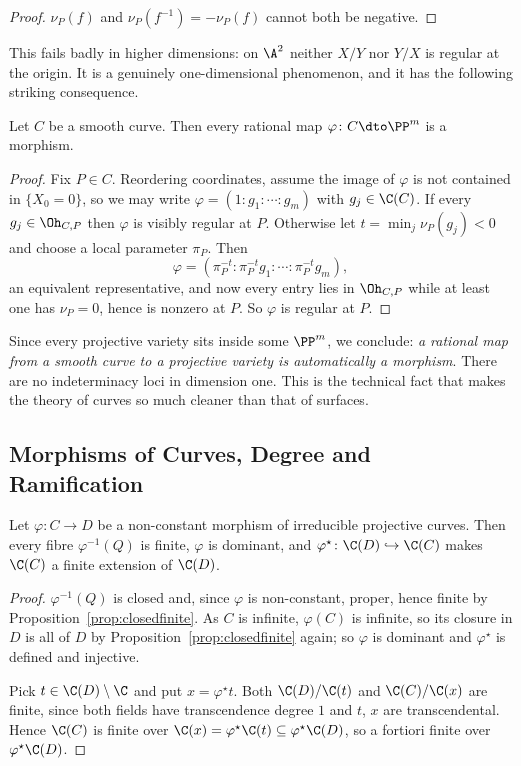 \begin{proof}
	$\nu_P(f)$ and $\nu_P(f^{-1}) = -\nu_P(f)$ cannot both be negative.
\end{proof}

This fails badly in higher dimensions: on $\A^2$ neither $X/Y$ nor $Y/X$ is regular at the origin. It is a genuinely one-dimensional phenomenon, and it has the following striking consequence.

\begin{corollary}\label{cor:ratismorph}
	Let $C$ be a smooth curve. Then every rational map $\varphi \colon C \dto \PP^m$ is a morphism.
\end{corollary}

\begin{proof}
	Fix $P \in C$. Reordering coordinates, assume the image of $\varphi$ is not contained in $\{X_0 = 0\}$, so we may write $\varphi = (1 : g_1 : \cdots : g_m)$ with $g_j \in \C(C)$. If every $g_j \in \Oh_{C,P}$ then $\varphi$ is visibly regular at $P$. Otherwise let $t = \min_j \nu_P(g_j) < 0$ and choose a local parameter $\pi_P$. Then
	$$\varphi = \left(\pi_P^{-t} : \pi_P^{-t}g_1 : \cdots : \pi_P^{-t}g_m\right),$$
	an equivalent representative, and now every entry lies in $\Oh_{C,P}$ while at least one has $\nu_P = 0$, hence is nonzero at $P$. So $\varphi$ is regular at $P$.
\end{proof}

Since every projective variety sits inside some $\PP^m$, we conclude: \emph{a rational map from a smooth curve to a projective variety is automatically a morphism}. There are no indeterminacy loci in dimension one. This is the technical fact that makes the theory of curves so much cleaner than that of surfaces.

\subsection{Morphisms of Curves, Degree and Ramification}

\begin{proposition}\label{prop:degfinite}
	Let $\varphi \colon C \to D$ be a non-constant morphism of irreducible projective curves. Then every fibre $\varphi^{-1}(Q)$ is finite, $\varphi$ is dominant, and $\varphi^\star \colon \C(D)\hookrightarrow\C(C)$ makes $\C(C)$ a finite extension of $\C(D)$.
\end{proposition}

\begin{proof}
	$\varphi^{-1}(Q)$ is closed and, since $\varphi$ is non-constant, proper, hence finite by Proposition~\ref{prop:closedfinite}. As $C$ is infinite, $\varphi(C)$ is infinite, so its closure in $D$ is all of $D$ by Proposition~\ref{prop:closedfinite} again; so $\varphi$ is dominant and $\varphi^\star$ is defined and injective.

	Pick $t \in \C(D)\setminus\C$ and put $x = \varphi^\star t$. Both $\C(D)/\C(t)$ and $\C(C)/\C(x)$ are finite, since both fields have transcendence degree $1$ and $t$, $x$ are transcendental. Hence $\C(C)$ is finite over $\C(x) = \varphi^\star\C(t) \subseteq \varphi^\star\C(D)$, so a fortiori finite over $\varphi^\star \C(D)$.
\end{proof}

